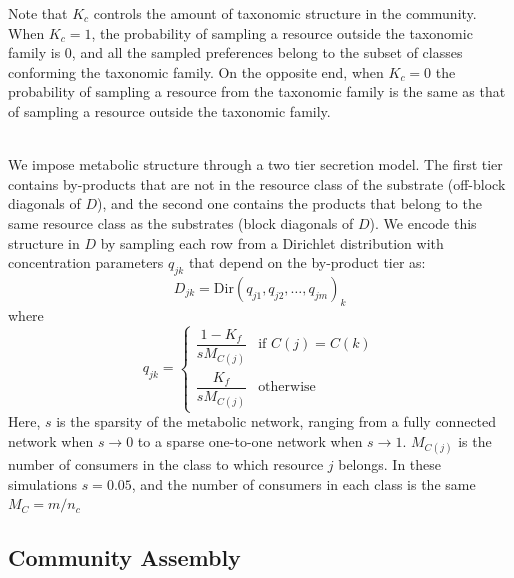 \documentclass[12pt]{article}
\begin{document}
            Note that $K_c$ controls the amount of taxonomic structure in the community. When $K_c = 1$, the probability of sampling a resource outside the taxonomic family is 0, and all the sampled preferences belong to the subset of classes conforming the taxonomic family. On the opposite end, when $K_c = 0$ the probability of sampling a resource from the taxonomic family is the same as that of sampling a resource outside the taxonomic family.\par\\
            We impose metabolic structure through a two tier secretion model. The first tier contains by-products that are not in the resource class of the substrate (off-block diagonals of $D$), and the second one contains the products that belong to the same resource class as the substrates (block diagonals of $D$). We encode this structure in $D$ by sampling each row from a Dirichlet distribution with concentration parameters $q_{jk}$ that depend on the by-product tier as:
            \begin{equation}
                D_{jk} = \text{Dir}\left(q_{j1}, q_{j2}, \dots  , q_{jm}\right)_k
            \end{equation}
            where
            \begin{equation}
                q_{jk} = 
                \begin{cases}
                    \dfrac{1-K_f}{sM_{C(j)}} & \text{if } C(j) = C(k)\\
                    \dfrac{K_f}{sM_{C(j)}} & \text{otherwise}
                \end{cases}
             \end{equation}
            Here, $s$ is the sparsity of the metabolic network, ranging from a fully connected network when $s \rightarrow 0$ to a sparse one-to-one network when $s \rightarrow 1$. $M_{C(j)}$ is the number of consumers in the class to which resource $j$ belongs. In these simulations $s = 0.05$, and the number of consumers in each class is the same $M_{C} = m/n_c$\\
            
    	\subsection{Community Assembly}
    	
\end{document}
